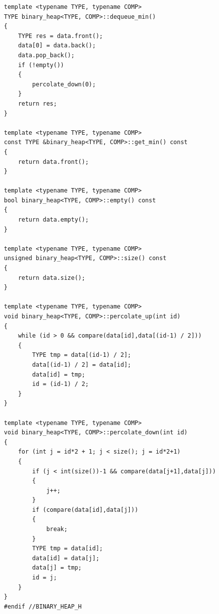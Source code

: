 \documentclass[12pt,a4paper]{article}
\theoremstyle{definition}
\begin{document}
\begin{lstlisting}
template <typename TYPE, typename COMP>
TYPE binary_heap<TYPE, COMP>::dequeue_min()
{
    TYPE res = data.front();
    data[0] = data.back();
    data.pop_back();
    if (!empty())
    {
        percolate_down(0);
    }
    return res;
}

template <typename TYPE, typename COMP>
const TYPE &binary_heap<TYPE, COMP>::get_min() const
{
    return data.front();
}

template <typename TYPE, typename COMP>
bool binary_heap<TYPE, COMP>::empty() const
{
    return data.empty();
}

template <typename TYPE, typename COMP>
unsigned binary_heap<TYPE, COMP>::size() const
{
    return data.size();
}

template <typename TYPE, typename COMP>
void binary_heap<TYPE, COMP>::percolate_up(int id)
{
    while (id > 0 && compare(data[id],data[(id-1) / 2]))
    {
        TYPE tmp = data[(id-1) / 2];
        data[(id-1) / 2] = data[id];
        data[id] = tmp;
        id = (id-1) / 2;
    }
}

template <typename TYPE, typename COMP>
void binary_heap<TYPE, COMP>::percolate_down(int id)
{
    for (int j = id*2 + 1; j < size(); j = id*2+1)
    {
        if (j < int(size())-1 && compare(data[j+1],data[j]))
        {
            j++;
        }
        if (compare(data[id],data[j]))
        {
            break;
        }
        TYPE tmp = data[id];
        data[id] = data[j];
        data[j] = tmp;
        id = j;
    }
}
#endif //BINARY_HEAP_H
\end{lstlisting}
\end{document}
